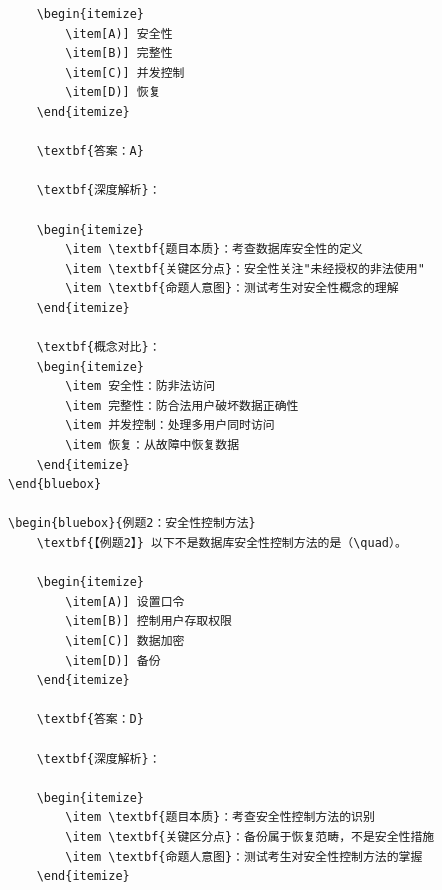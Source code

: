 \documentclass[12pt, a4paper]{article}
\newenvironment{bluebox}[1]{%
  \begin{trivlist}
  \item[\hskip\labelsep \textbf{#1}]
  \setlength{\parskip}{0.5ex}
  \setlength{\itemsep}{0.5ex}
}{%
  \end{trivlist}
}
\begin{document}
\begin{bluebox}{用户管理}
\begin{enumerate}[leftmargin=*, label=\textbf{\arabic*.}]
\begin{verbatim}
	\begin{itemize}
		\item[A)] 安全性
		\item[B)] 完整性
		\item[C)] 并发控制
		\item[D)] 恢复
	\end{itemize}

	\textbf{答案：A}

	\textbf{深度解析}：

	\begin{itemize}
		\item \textbf{题目本质}：考查数据库安全性的定义
		\item \textbf{关键区分点}：安全性关注"未经授权的非法使用"
		\item \textbf{命题人意图}：测试考生对安全性概念的理解
	\end{itemize}

	\textbf{概念对比}：
	\begin{itemize}
		\item 安全性：防非法访问
		\item 完整性：防合法用户破坏数据正确性
		\item 并发控制：处理多用户同时访问
		\item 恢复：从故障中恢复数据
	\end{itemize}
\end{bluebox}

\begin{bluebox}{例题2：安全性控制方法}
	\textbf{【例题2】} 以下不是数据库安全性控制方法的是（\quad）。

	\begin{itemize}
		\item[A)] 设置口令
		\item[B)] 控制用户存取权限
		\item[C)] 数据加密
		\item[D)] 备份
	\end{itemize}

	\textbf{答案：D}

	\textbf{深度解析}：

	\begin{itemize}
		\item \textbf{题目本质}：考查安全性控制方法的识别
		\item \textbf{关键区分点}：备份属于恢复范畴，不是安全性措施
		\item \textbf{命题人意图}：测试考生对安全性控制方法的掌握
	\end{itemize}


\end{verbatim}
\end{enumerate}
\end{bluebox}
\end{document}
